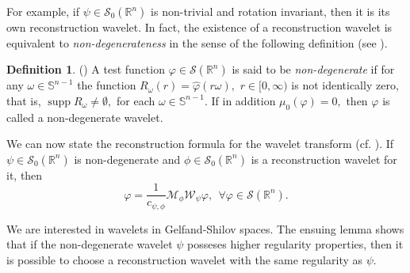 \documentclass[reqno,12pt]{amsart}
\theoremstyle{plain}
\theoremstyle{definition}
\newtheorem{definition}{Definition}
\theoremstyle{remark}
\begin{document}
\par

For example, if $ \psi \in \mathcal S_0 (\mathbb{R}^n) $ is
non-trivial and rotation invariant, then it is its own
reconstruction wavelet. In fact, the existence of  a reconstruction wavelet is equivalent to
\emph{non-degenerateness} in the sense of the following definition (see \cite[Proposition 5.1]{vindas-pilipovic-2}).

\begin{definition} \label{non-degenerate}
(\cite{vindas-pilipovic, vindas-pilipovic-2}) A test function $\varphi\in\mathcal{S}
(\mathbb{R}^n)$ is said to be \emph{non-degenerate} if for any
$\omega\in \mathbb{S}^{n-1}$ the function
$R_{\omega}(r)=\hat{\varphi}(r\omega), $ $ r \in [0,\infty)$ is not
identically zero, that is, $ \operatorname*{supp}
R_{\omega}\neq\emptyset, $ for each $ \omega\in\mathbb{S}^{n-1}. $
If in addition $ \mu_0 (\varphi) = 0, $ then $\varphi$ is called a
non-degenerate wavelet.
\end{definition}

\par

We can now state the reconstruction formula for the wavelet transform (cf. \cite[Theorem 14.0.2]{hol1}). If $\psi\in\mathcal{S}_{0}(\mathbb{R}^{n})$ is non-degenerate and $\phi\in\mathcal{S}_{0}(\mathbb{R}^{n})$ is a reconstruction wavelet for it, then
\begin{equation}
\label{reconstruction}
\varphi= \frac{1}{c_{\psi,\phi}}  \mathcal{M}_{\phi}
\mathcal{W}_{\psi} \varphi, \: \: \forall \varphi \in  {\mathcal S}(\mathbb{R}^n).
\end{equation}

We are interested in wavelets in Gelfand-Shilov spaces. The ensuing lemma shows that if the non-degenerate wavelet $\psi$ posseses higher regularity properties, then it is possible to choose a reconstruction wavelet with the same regularity as $\psi$.

\par
\end{document}
